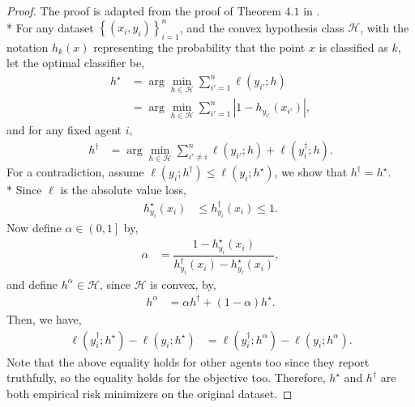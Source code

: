 \documentclass{article}
\begin{document}
\begin{proof} \label{proof:dfppf} 
The proof is adapted from the proof of Theorem $4.1$ in \citet*{dekel2010incentive}.
\\* For any dataset $\left\{\left(x_{i}, y_{i}\right)\right\}_{i=1}^{n}$, and the convex hypothesis class $\mathcal{H}$, with the notation $h_{k}\left(x\right)$ representing the probability that the point $x $ is classified as $k $, let the optimal classifier be,
\begin{align*}
h^\star  &= \arg\displaystyle\min_{h \in \mathcal{H}} \displaystyle\sum_{i'=1}^{n} \ell\left(y_{i'} ; h\right)
\\ &= \arg\displaystyle\min_{h \in \mathcal{H}} \displaystyle\sum_{i'=1}^{n} \left| 1 - h_{y_{i'}}\left(x_{i'}\right) \right|,
\end{align*}
and for any fixed agent $i, $
\begin{align*}
h^{\dagger} &= \arg\displaystyle\min_{h \in \mathcal{H}} \displaystyle\sum_{i' \neq  i}^{n} \ell\left(y_{i'} ; h\right) + \ell\left(y^{\dagger}_{i} ; h\right).
\end{align*}
For a contradiction, assume $\ell\left(y_{i}; h^{\dagger}\right) \leq  \ell\left(y_{i}; h^\star \right)$, we show that $h^{\dagger} = h^\star $.
\\* Since $\ell$ is the absolute value loss,
\begin{align*}
h^\star _{y_{i}}\left(x_{i}\right) &\leq  h^{\dagger}_{y_{i}}\left(x_{i}\right) \leq  1.
\end{align*}
Now define $\alpha \in \left(0, 1\right]$ by,
\begin{align*}
\alpha &= \dfrac{1 - h^\star _{y_{i}}\left(x_{i}\right)}{h^{\dagger}_{y_{i}}\left(x_{i}\right) - h^\star _{y_{i}}\left(x_{i}\right)},
\end{align*}
and define $h^{\alpha} \in \mathcal{H}$, since $\mathcal{H}$ is convex, by,
\begin{align*}
h^{\alpha} &= \alpha h^{\dagger} + \left(1 - \alpha\right) h^\star .
\end{align*}
Then, we have,
\begin{align*}
\ell\left(y^{\dagger}_{i} ; h^\star \right) - \ell\left(y_{i} ; h^\star \right) &= \ell\left(y^{\dagger}_{i} ; h^{\alpha}\right) - \ell\left(y_{i} ; h^{\alpha}\right).
\end{align*}
Note that the above equality holds for other agents too since they report truthfully, so the equality holds for the objective too. Therefore, $h^\star $ and $h^{\dagger}$ are both empirical risk minimizers on the original dataset.
\newline \newline\end{proof}
\end{document}
